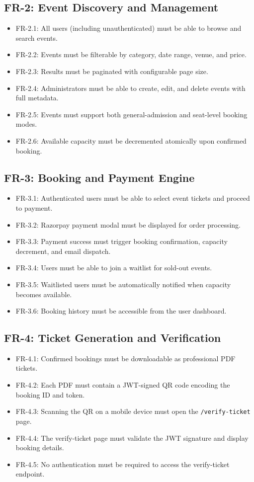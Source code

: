 \documentclass[12pt,a4paper]{report}
\begin{document}
\subsection{FR-2: Event Discovery and Management}
\begin{itemize}[leftmargin=2em]
    \item FR-2.1: All users (including unauthenticated) must be able to browse and search events.
    \item FR-2.2: Events must be filterable by category, date range, venue, and price.
    \item FR-2.3: Results must be paginated with configurable page size.
    \item FR-2.4: Administrators must be able to create, edit, and delete events with full metadata.
    \item FR-2.5: Events must support both general-admission and seat-level booking modes.
    \item FR-2.6: Available capacity must be decremented atomically upon confirmed booking.
\end{itemize}

\subsection{FR-3: Booking and Payment Engine}
\begin{itemize}[leftmargin=2em]
    \item FR-3.1: Authenticated users must be able to select event tickets and proceed to payment.
    \item FR-3.2: Razorpay payment modal must be displayed for order processing.
    \item FR-3.3: Payment success must trigger booking confirmation, capacity decrement, and email dispatch.
    \item FR-3.4: Users must be able to join a waitlist for sold-out events.
    \item FR-3.5: Waitlisted users must be automatically notified when capacity becomes available.
    \item FR-3.6: Booking history must be accessible from the user dashboard.
\end{itemize}

\subsection{FR-4: Ticket Generation and Verification}
\begin{itemize}[leftmargin=2em]
    \item FR-4.1: Confirmed bookings must be downloadable as professional PDF tickets.
    \item FR-4.2: Each PDF must contain a JWT-signed QR code encoding the booking ID and token.
    \item FR-4.3: Scanning the QR on a mobile device must open the \texttt{/verify-ticket} page.
    \item FR-4.4: The verify-ticket page must validate the JWT signature and display booking details.
    \item FR-4.5: No authentication must be required to access the verify-ticket endpoint.
\end{itemize}
\end{document}
